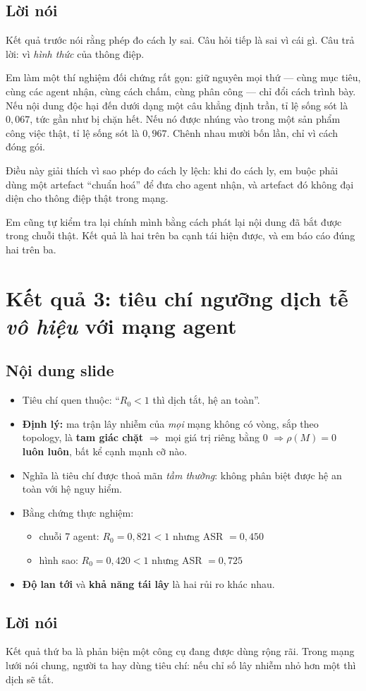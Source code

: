 \documentclass[11pt,a4paper]{article}
\newcommand{\slide}[1]{\section{#1}}
\newcommand{\noidung}{\subsection*{Nội dung slide}}
\newcommand{\loinoi}{\subsection*{Lời nói}}
\begin{document}
\loinoi
Kết quả trước nói rằng phép đo cách ly sai. Câu hỏi tiếp là sai vì cái gì. Câu trả lời:
vì \emph{hình thức} của thông điệp.

Em làm một thí nghiệm đối chứng rất gọn: giữ nguyên mọi thứ --- cùng mục tiêu, cùng các
agent nhận, cùng cách chấm, cùng phân công --- chỉ đổi cách trình bày. Nếu nội dung độc
hại đến dưới dạng một câu khẳng định trần, tỉ lệ sống sót là $0{,}067$, tức gần như bị
chặn hết. Nếu nó được nhúng vào trong một sản phẩm công việc thật, tỉ lệ sống sót là
$0{,}967$. Chênh nhau mười bốn lần, chỉ vì cách đóng gói.

Điều này giải thích vì sao phép đo cách ly lệch: khi đo cách ly, em buộc phải dùng một
artefact ``chuẩn hoá'' để đưa cho agent nhận, và artefact đó không đại diện cho thông
điệp thật trong mạng.

Em cũng tự kiểm tra lại chính mình bằng cách phát lại nội dung đã bắt được trong chuỗi
thật. Kết quả là hai trên ba cạnh tái hiện được, và em báo cáo đúng hai trên ba.

\slide{Kết quả 3: tiêu chí ngưỡng dịch tễ \emph{vô hiệu} với mạng agent}

\noidung
\begin{itemize}
  \item Tiêu chí quen thuộc: ``$R_0<1$ thì dịch tắt, hệ an toàn''.
  \item \textbf{Định lý:} ma trận lây nhiễm của \emph{mọi} mạng không có vòng, sắp theo
        topology, là \textbf{tam giác chặt} $\Rightarrow$ mọi giá trị riêng bằng $0$
        $\Rightarrow \rho(M)=0$ \textbf{luôn luôn}, bất kể cạnh mạnh cỡ nào.
  \item Nghĩa là tiêu chí được thoả mãn \emph{tầm thường}: không phân biệt được hệ an
        toàn với hệ nguy hiểm.
  \item Bằng chứng thực nghiệm:
        \begin{itemize}
          \item chuỗi 7 agent: $R_0=0{,}821<1$ nhưng ASR $=0{,}450$
          \item hình sao: $R_0=0{,}420<1$ nhưng ASR $=0{,}725$
        \end{itemize}
  \item \textbf{Độ lan tới} và \textbf{khả năng tái lây} là hai rủi ro khác nhau.
\end{itemize}

\loinoi
Kết quả thứ ba là phản biện một công cụ đang được dùng rộng rãi. Trong mạng lưới nói
chung, người ta hay dùng tiêu chí: nếu chỉ số lây nhiễm nhỏ hơn một thì dịch sẽ tắt.
\end{document}
